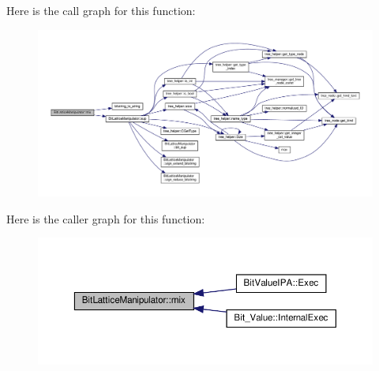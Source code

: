 Here is the call graph for this function\+:
\nopagebreak
\begin{figure}[H]
\begin{center}
\leavevmode
\includegraphics[width=350pt]{dd/d98/classBitLatticeManipulator_a0834f7ec7dd8449fae5bdb6c60619956_cgraph}
\end{center}
\end{figure}
Here is the caller graph for this function\+:
\nopagebreak
\begin{figure}[H]
\begin{center}
\leavevmode
\includegraphics[width=350pt]{dd/d98/classBitLatticeManipulator_a0834f7ec7dd8449fae5bdb6c60619956_icgraph}
\end{center}
\end{figure}
\mbox{\label{classBitLatticeManipulator_a4f374ceca7857bb7bc52a31f3f9872f9}} 
